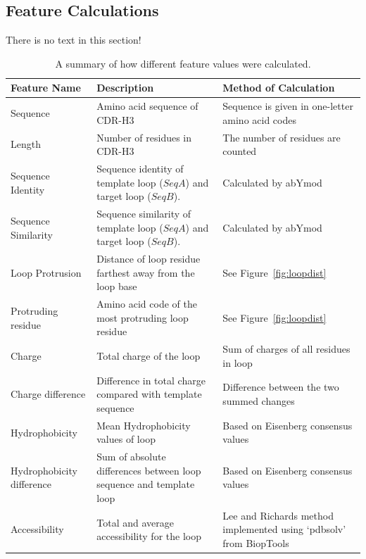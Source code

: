 \documentclass[12pt]{article}
\newcommand{\lilian}[1]{ {\color{red}{\bfseries Lilian:} #1}}
\begin{document}
\subsection{Feature Calculations}

\lilian{There is no text in this section!}

\begin{landscape}
\begin{longtable}{p{3cm}p{10cm}p{10cm}}
  \caption{A summary of how different feature values were calculated.}
  \label{tab:feature_table}\\ \hline
%
  \mbox{Feature} \mbox{Name}  %
  & Description %
  & Method of Calculation\\ \hline
%  
  Sequence %
  & Amino acid sequence of CDR-H3 %
  & Sequence is given in one-letter amino acid codes\\
%  
  Length %
  & Number of residues in CDR-H3 %
  & The number of residues are counted\\
%  
  \mbox{Sequence} \mbox{Identity} %
  & Sequence identity of template loop ($SeqA$) and target loop ($SeqB$). %
  & Calculated by abYmod\\
%  
  \mbox{Sequence} \mbox{Similarity} %
  & Sequence similarity of template loop ($SeqA$) and target loop ($SeqB$). %
  & Calculated by abYmod\\
%  
  \mbox{Loop} \mbox{Protrusion} %
  & Distance of loop residue farthest away from the loop base %
  & See Figure~\protect\ref{fig:loopdist}\\
%  
  \mbox{Protruding} \mbox{residue} %
  & Amino acid code of the most protruding loop residue %
  & See Figure~\protect\ref{fig:loopdist}\\
%  
  Charge %
  & Total charge of the loop %
  & Sum of charges of all residues in loop\\
%  
  \mbox{Charge} \mbox{difference} %
  & Difference in total charge compared with template sequence %
  & Difference between the two summed changes\\
%  
  Hydrophobicity %
  & Mean Hydrophobicity values of loop %
  & Based on Eisenberg consensus values\\
%  
  \mbox{Hydrophobicity} \mbox{difference} %
  & Sum of absolute differences between loop sequence and template loop %
  & Based on Eisenberg consensus values\\
%  
  Accessibility %
  & Total and average accessibility for the loop %
  & Lee and Richards method implemented using `pdbsolv' from BiopTools\\

\end{longtable}
\end{landscape}
\end{document}
